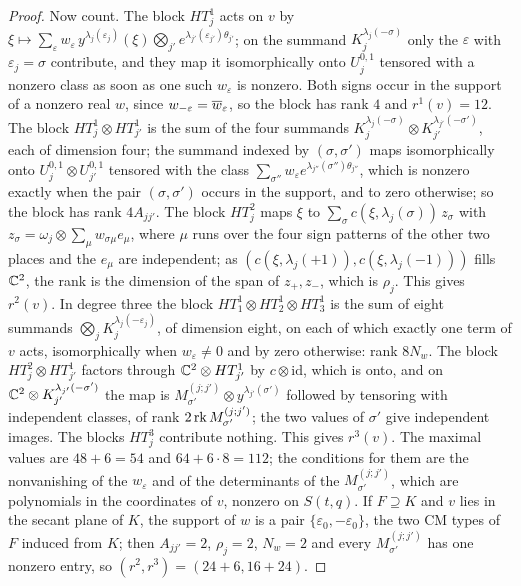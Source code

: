 \begin{proof}
Now count. The block $HT^{1}_{j}$ acts on $v$ by
$\xi\mapsto\sum_{\varepsilon}w_{\varepsilon}\,y^{\lambda_{j}(\varepsilon_{j})}(\xi)
\bigotimes_{j'}e^{\lambda_{j'}(\varepsilon_{j'})\theta_{j'}}$; on the summand
$K^{\lambda_{j}(-\sigma)}_{j}$ only the $\varepsilon$ with
$\varepsilon_{j}=\sigma$ contribute, and they map it isomorphically onto
$U_{j}^{0,1}$ tensored with a nonzero class as soon as one such
$w_{\varepsilon}$ is nonzero. Both signs occur in the support of a nonzero real
$w$, since $w_{-\varepsilon}=\overline{w}_{\varepsilon}$, so the block has rank $4$
and $r^{1}(v)=12$. The block $HT^{1}_{j}\otimes HT^{1}_{j'}$ is the sum of the
four summands $K^{\lambda_{j}(-\sigma)}_{j}\otimes K^{\lambda_{j'}(-\sigma')}_{j'}$,
each of dimension four; the summand indexed by $(\sigma,\sigma')$ maps
isomorphically onto $U_{j}^{0,1}\otimes U_{j'}^{0,1}$ tensored with the class
$\sum_{\sigma''}w_{\varepsilon}e^{\lambda_{j''}(\sigma'')\theta_{j''}}$, which
is nonzero exactly when the pair $(\sigma,\sigma')$ occurs in the support, and
to zero otherwise; so the block has rank $4A_{jj'}$. The block $HT^{2}_{j}$
maps $\xi$ to $\sum_{\sigma}c(\xi,\lambda_{j}(\sigma))\,z_{\sigma}$ with
$z_{\sigma}=\omega_{j}\otimes\sum_{\mu}w_{\sigma\mu}e_{\mu}$, where $\mu$ runs
over the four sign patterns of the other two places and the $e_{\mu}$ are
independent; as $(c(\xi,\lambda_{j}(+1)),c(\xi,\lambda_{j}(-1)))$ fills
$\mathbb{C}^{2}$, the rank is the dimension of the span of $z_{+},z_{-}$, which is
$\rho_{j}$. This gives $r^{2}(v)$. In degree three the block
$HT^{1}_{1}\otimes HT^{1}_{2}\otimes HT^{1}_{3}$ is the sum of eight summands
$\bigotimes_{j}K^{\lambda_{j}(-\varepsilon_{j})}_{j}$, of dimension eight, on
each of which exactly one term of $v$ acts, isomorphically when
$w_{\varepsilon}\ne0$ and by zero otherwise: rank $8N_{w}$. The block
$HT^{2}_{j}\otimes HT^{1}_{j'}$ factors through $\mathbb{C}^{2}\otimes HT^{1}_{j'}$
by $c\otimes\mathrm{id}$, which is onto, and on
$\mathbb{C}^{2}\otimes K^{\lambda_{j'}(-\sigma')}_{j'}$ the map is
$M^{(j;j')}_{\sigma'}\otimes y^{\lambda_{j'}(\sigma')}$ followed by tensoring
with independent classes, of rank $2\operatorname{rk} M^{(j;j')}_{\sigma'}$; the two values
of $\sigma'$ give independent images. The blocks $HT^{3}_{j}$ contribute
nothing. This gives $r^{3}(v)$. The maximal values are $48+6=54$ and
$64+6\cdot8=112$; the conditions for them are the nonvanishing of the
$w_{\varepsilon}$ and of the determinants of the $M^{(j;j')}_{\sigma'}$, which
are polynomials in the coordinates of $v$, nonzero on $S(t,q)$. If $F\supseteq K$
and $v$ lies in the secant plane of $K$, the support of $w$ is a pair
$\{\varepsilon_{0},-\varepsilon_{0}\}$, the two CM types of $F$ induced from
$K$; then $A_{jj'}=2$, $\rho_{j}=2$, $N_{w}=2$ and every
$M^{(j;j')}_{\sigma'}$ has one nonzero entry, so $(r^{2},r^{3})=(24+6,16+24)$.


\end{proof}
